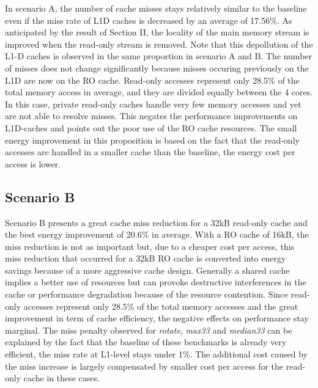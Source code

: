 \documentclass[sigconf]{acmart}
\begin{document}
In scenario A, the number of cache misses stays relatively similar to the baseline even if the miss rate of L1D caches is decreased by an average of 17.56\%. As anticipated by the result of Section II, the locality of the main memory stream is improved when the read-only stream is removed. Note that this depollution of the L1-D caches is observed in the same proportion in scenario A and B. The number of misses does not change significantly because misses occuring previously on the L1D are now on the RO cache. Read-only accesses represent only 28.5\% of the total memory access in average, and they are divided equally between the 4 cores. In this case, private read-only caches handle very few memory accesses and yet are not able to resolve misses. This negates the performance improvements on L1D-caches and points out the poor use of the RO cache resources. The small energy improvement in this proposition is based on the fact that the read-only accesses are handled in a smaller cache than the baseline, the energy cost per access is lower.

\subsection{Scenario B}

Scenario B presents a great cache miss reduction for a 32kB read-only
cache and the best energy improvement of 20.6\% in average. With a RO
cache of 16kB, the miss reduction is not as important but, due to a
cheaper cost per access, this miss reduction that occurred for a 32kB
RO cache is converted into energy savings because of a more aggressive
cache design.
Generally a shared cache implies a better use of resources but
can provoke destructive interferences in the cache or performance
degradation because of the resource contention. Since read-only
accesses represent only 28.5\% of the total memory accesses and the
great improvement in term of cache efficiency, the negative effects on
performance stay marginal. The miss penalty observed for \textit{rotate},
\textit{max33} and \textit{median33} can be explained by the fact that
the baseline of these benchmarks is already very efficient, the miss
rate at L1-level stays under 1\%. The additional cost caused by the miss increase is largely compensated by smaller cost per access for the read-only cache in these cases. 
\end{document}
